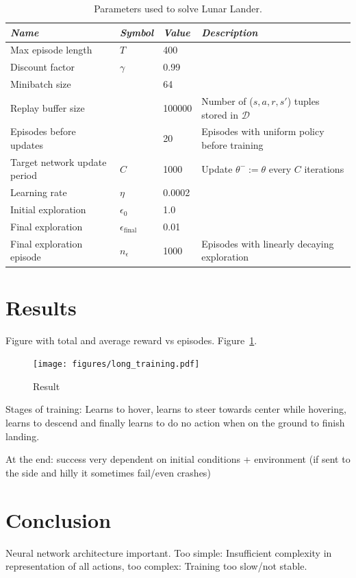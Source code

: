 \documentclass{article}
\begin{document}
\begin{table}
  \centering
  \caption{Parameters used to solve Lunar Lander.}
  \label{tbl:params}
\begin{tabular}{*4l} \toprule
\emph{Name}       & \emph{Symbol} & \emph{Value} & \emph{Description} \\ \midrule
Max episode length                 & $T$ & 400 & \\
Discount factor & $\gamma$ & 0.99   & \\
Minibatch size &  & 64 & \\
Replay buffer size & & 100000 & Number of ($s,a,r,s'$) tuples stored in $\mathcal{D}$ \\
Episodes before updates & & 20 & Episodes with uniform policy before training \\
Target network update period & $C$ & 1000 & Update $\theta^{-} := \theta$ every $C$ iterations \\
Learning rate & $\eta$ & 0.0002 & \\
Initial exploration & $\epsilon_0$ & 1.0 & \\
Final exploration & $\epsilon_{\text{final}}$ & 0.01 & \\
Final exploration episode & $n_\epsilon$ & 1000 & Episodes with linearly decaying exploration \\ \bottomrule
\end{tabular}
\end{table}

\section{Results}
\label{results}
Figure with total and average reward vs episodes. Figure~\ref{fig:training}.

\begin{figure}
  \centering
  \texttt{[image: figures/long\_training.pdf]}
  \caption{Result}
  \label{fig:training}
\end{figure}

Stages of training: Learns to hover, learns to steer towards center while hovering, learns to descend and finally learns to do no action when on the ground to finish landing.

At the end: success very dependent on initial conditions + environment (if sent to the side and hilly it sometimes fail/even crashes)

\section{Conclusion}
\label{conclusion}
Neural network architecture important. Too simple: Insufficient complexity in representation of all actions, too complex: Training too slow/not stable.
\end{document}
